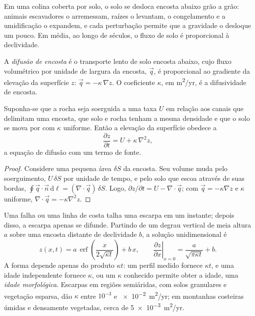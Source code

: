 Em uma colina coberta por solo, o solo se desloca encosta abaixo grão a grão: animais escavadores
o arremessam, raízes o levantam, o congelamento e a umidificação o expandem, e cada
perturbação permite que a gravidade o desloque um pouco. Em média, ao longo de séculos, o
fluxo de solo é proporcional à declividade.

\begin{definition}\label{def:b3:quantitative-geomorphology:diffusion}
A \emph{difusão de encosta} é o transporte lento
de solo encosta abaixo, cujo fluxo volumétrico por unidade de largura da encosta,
$\vec q$, é proporcional ao gradiente da elevação da superfície $z$:
$\vec q = -\kappa\,\nabla z$. O coeficiente $\kappa$, em
\unit{m^2/yr}, é a difusividade de encosta.
\end{definition}

\begin{theorem}\label{thm:b3:quantitative-geomorphology:diffusion}
Suponha-se que a rocha seja soerguida a uma taxa $U$ em relação aos canais que
delimitam uma encosta, que solo e rocha tenham a mesma densidade e que o solo se
mova por  com $\kappa$ uniforme. Então a elevação da superfície obedece a
\[
\frac{\partial z}{\partial t} = U + \kappa\,\nabla^2 z ,
\]
a equação de difusão com um termo de fonte.
\end{theorem}

\begin{proof}
Considere uma pequena área $\delta S$ da encosta. Seu volume muda pelo soerguimento,
$U\,\delta S$ por unidade de tempo, e pelo solo que escoa através de suas
bordas, $\oint \vec q\cdot\vec n\,\mathrm{d}\ell = (\nabla\cdot\vec q)\,\delta S$.
Logo, $\partial z/\partial t = U - \nabla\cdot\vec q$; com $\vec q = -\kappa
\nabla z$ e $\kappa$ uniforme, $\nabla\cdot\vec q = -\kappa\nabla^2 z$.
\end{proof}

Uma falha ou uma linha de costa talha uma escarpa em um instante; depois disso, a
escarpa apenas se difunde. Partindo de um degrau vertical de meia altura $a$ sobre
uma encosta distante de declividade $b$, a solução unidimensional é
\[
z(x,t) = a\,\operatorname{erf}\!\left(\frac{x}{2\sqrt{\kappa t}}\right) + b\,x ,
\qquad
\left.\frac{\partial z}{\partial x}\right|_{x=0} = \frac{a}{\sqrt{\pi\kappa t}} + b .
\]
A forma depende apenas do produto $\kappa t$: um perfil medido fornece $\kappa t$, e
uma idade independente fornece $\kappa$, ou um $\kappa$ conhecido permite obter a
idade, uma \emph{idade morfológica}. Escarpas em regiões semiáridas, com solos granulares e
vegetação esparsa, dão $\kappa$ entre
$10^{-3}$ e \qty{e-2}{m^2/yr}; em montanhas costeiras úmidas e densamente vegetadas,
cerca de \qty{5e-3}{m^2/yr}.

